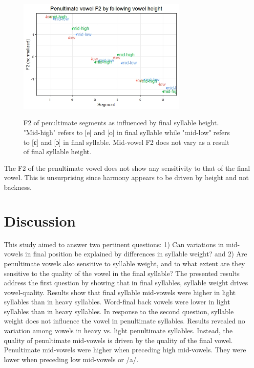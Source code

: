 \documentclass[12pt]{ouparticle}
\begin{document}
\begin{figure}[h!]
\centering
    \caption{F2 of penultimate segments as influenced by final syllable height. "Mid-high" refers to [e] and [o] in final syllable while "mid-low" refers to [ɛ] and [ɔ] in final syllable. Mid-vowel F2 does not vary as a result of final syllable height.}
    \includegraphics[width=0.75\textwidth]{Figure10.jpg}
    \label{fig:Syll2f2_Segfh}
\end{figure}

The F2 of the penultimate vowel does not show any sensitivity to that of the final vowel. This is unsurprising since harmony appears to be driven by height and not backness.

\newpage

\section{Discussion}\label{sec:discussion}

This study aimed to answer two pertinent questions: 1) Can variations in mid-vowels in final position be explained by differences in syllable weight? and 2) Are penultimate vowels also sensitive to syllable weight, and to what extent are they sensitive to the quality of the vowel in the final syllable?
The presented results address the first question by showing that in final syllables, syllable weight drives vowel-quality. Results show that final syllable mid-vowels were higher in light syllables than in heavy syllables. Word-final back vowels were lower in light syllables than in heavy syllables. In response to the second question, syllable weight does not influence the vowel in penultimate syllables. Results revealed no variation among vowels in heavy vs. light penultimate syllables. Instead, the quality of penultimate mid-vowels is driven by the quality of the final vowel. Penultimate mid-vowels were higher when preceding high mid-vowels. They were lower when preceding low mid-vowels or /a/. 
\end{document}
